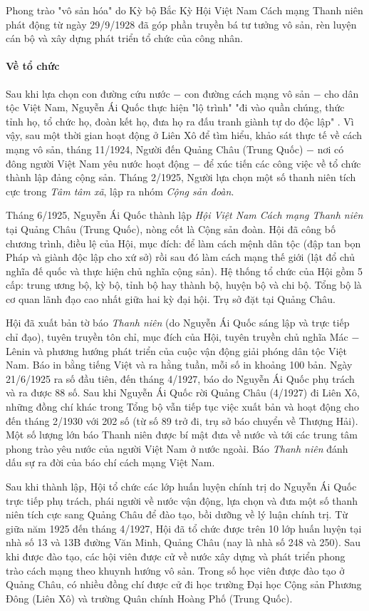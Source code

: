 Phong trào "vô sản hóa" do Kỳ bộ Bắc Kỳ Hội Việt Nam Cách mạng Thanh niên phát động từ ngày 29/9/1928 đã góp phần truyền bá tư tưởng vô sản, rèn luyện cán bộ và xây dựng phát triển tổ chức của công nhân.

\paragraph{Về tổ chức}
Sau khi lựa chọn con đường cứu nước $-$ con đường cách mạng vô sản $-$ cho dân tộc Việt Nam, Nguyễn Ái Quốc thực hiện "lộ trình" "đi vào quần chúng, thức tỉnh họ, tổ chức họ, đoàn kết họ, đưa họ ra đấu tranh giành tự do độc lập" . Vì vậy, sau một thời gian hoạt động ở Liên Xô để tìm hiểu, khảo sát thực tế về cách mạng vô sản, tháng 11/1924, Người đến Quảng Châu (Trung Quốc) $-$ nơi có đông người Việt Nam yêu nước hoạt động $-$ để xúc tiến các công việc về tổ chức thành lập đảng cộng sản. Tháng 2/1925, Người lựa chọn một số thanh niên tích cực trong \textit{Tâm tâm xã}, lập ra nhóm \textit{Cộng sản đoàn}.

Tháng 6/1925, Nguyễn Ái Quốc thành lập \textit{Hội Việt Nam Cách mạng Thanh niên} tại Quảng Châu (Trung Quốc), nòng cốt là Cộng sản đoàn. Hội đã công bố chương trình, điều lệ của Hội, mục đích: để làm cách mệnh dân tộc (đập tan bọn Pháp và giành độc lập cho xứ sở) rồi sau đó làm cách mạng thế giới (lật đổ chủ nghĩa đế quốc và thực hiện chủ nghĩa cộng sản). Hệ thống tổ chức của Hội gồm 5 cấp: trung ương bộ, kỳ bộ, tỉnh bộ hay thành bộ, huyện bộ và chi bộ. Tổng bộ là cơ quan lãnh đạo cao nhất giữa hai kỳ đại hội. Trụ sở đặt tại Quảng Châu.

Hội đã xuất bản tờ báo \textit{Thanh niên} (do Nguyễn Ái Quốc sáng lập và trực tiếp chỉ đạo), tuyên truyền tôn chỉ, mục đích của Hội, tuyên truyền chủ nghĩa Mác $-$ Lênin và phương hướng phát triển của cuộc vận động giải phóng dân tộc Việt Nam. Báo in bằng tiếng Việt và ra hằng tuần, mỗi số in khoảng 100 bản. Ngày 21/6/1925 ra số đầu tiên, đến tháng 4/1927, báo do Nguyễn Ái Quốc phụ trách và ra được 88 số. Sau khi Nguyễn Ái Quốc rời Quảng Châu (4/1927) đi Liên Xô, những đồng chí khác trong Tổng bộ vẫn tiếp tục việc xuất bản và hoạt động cho đến tháng 2/1930 với 202 số (từ số 89 trở đi, trụ sở báo chuyển về Thượng Hải). Một số lượng lớn báo Thanh niên được bí mật đưa về nước và tới các trung tâm phong trào yêu nước của người Việt Nam ở nước ngoài. Báo \textit{Thanh niên} đánh dấu sự ra đời của báo chí cách mạng Việt Nam.

Sau khi thành lập, Hội tổ chức các lớp huấn luyện chính trị do Nguyễn Ái Quốc trực tiếp phụ trách, phái người về nước vận động, lựa chọn và đưa một số thanh niên tích cực sang Quảng Châu để đào tạo, bồi dưỡng về lý luận chính trị. Từ giữa năm 1925 đến tháng 4/1927, Hội đã tổ chức được trên 10 lớp huấn luyện tại nhà số 13 và 13B đường Văn Minh, Quảng Châu (nay là nhà số 248 và 250). Sau khi được đào tạo, các hội viên được cử về nước xây dựng và phát triển phong trào cách mạng theo khuynh hướng vô sản. Trong số học viên được đào tạo ở Quảng Châu, có nhiều đồng chí được cử đi học trường Đại học Cộng sản Phương Đông (Liên Xô) và trường Quân chính Hoàng Phố (Trung Quốc).

